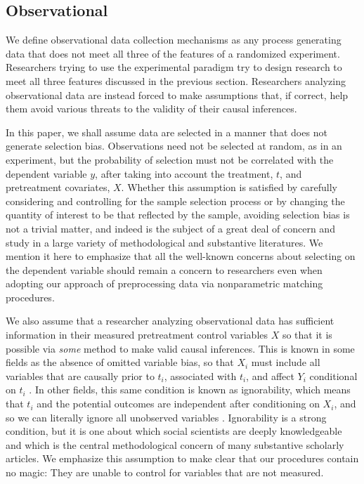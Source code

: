 \documentclass[11pt,titlepage]{article}
\begin{document}
\subsection{Observational}

We define observational data collection mechanisms as any process
generating data that does not meet all three of the features of a
randomized experiment.  Researchers trying to use the experimental
paradigm try to design research to meet all three features discussed
in the previous section.  Researchers analyzing observational data are
instead forced to make assumptions that, if correct, help them avoid
various threats to the validity of their causal inferences.

In this paper, we shall assume data are selected in a manner that does
not generate selection bias.  Observations need not be selected at
random, as in an experiment, but the probability of selection must not
be correlated with the dependent variable $y$, after taking into
account the treatment, $t$, and pretreatment covariates, $X$.  Whether
this assumption is satisfied by carefully considering and controlling
for the sample selection process or by changing the quantity of
interest to be that reflected by the sample, avoiding selection bias
is not a trivial matter, and indeed is the subject of a great deal of
concern and study in a large variety of methodological and substantive
literatures.  We mention it here to emphasize that all the well-known
concerns about selecting on the dependent variable should remain a
concern to researchers even when adopting our approach of
preprocessing data via nonparametric matching procedures.

We also assume that a researcher analyzing observational data has
sufficient information in their measured pretreatment control
variables $X$ so that it is possible via \emph{some} method to make
valid causal inferences.  This is known in some fields as the absence
of omitted variable bias, so that $X_i$ must include all variables
that are causally prior to $t_i$, associated with $t_i$, and affect
$Y_i$ conditional on $t_i$ \citep{Goldberger91,KinKeoVer94}.  In other
fields, this same condition is known as ignorability, which means that
$t_i$ and the potential outcomes are independent after conditioning on
$X_i$, and so we can literally ignore all unobserved variables
\citep{RosRub83}.  Ignorability is a strong condition, but it is one
about which social scientists are deeply knowledgeable and which is
the central methodological concern of many substantive scholarly
articles.  We emphasize this assumption to make clear that our
procedures contain no magic: They are unable to control for variables
that are not measured.
\end{document}
